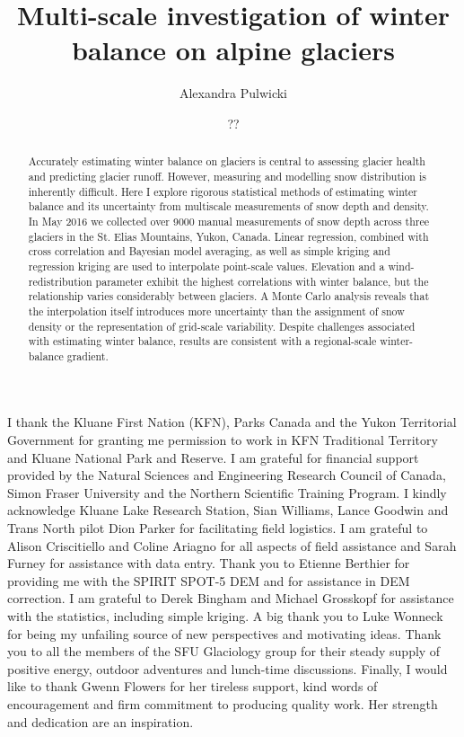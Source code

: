 \documentclass{sfuthesis}
\title{Multi-scale investigation of winter balance on alpine glaciers}
\author{Alexandra Pulwicki}
\date{??}
\begin{document}
\frontmatter
\maketitle{}
\makecommittee{}

\begin{abstract}
	Accurately estimating winter balance on glaciers is central to assessing glacier health and predicting glacier runoff. However, measuring and modelling snow distribution is inherently difficult. Here I explore rigorous statistical methods of estimating winter balance and its uncertainty from multiscale measurements of snow depth and density. In May 2016 we collected over 9000 manual measurements of snow depth across three glaciers in the St. Elias Mountains, Yukon, Canada. Linear regression, combined with cross correlation and Bayesian model averaging, as well as simple kriging and regression kriging are used to interpolate point-scale values. Elevation and a wind-redistribution parameter exhibit the highest correlations with winter balance, but the relationship varies considerably between glaciers. A Monte Carlo analysis reveals that the interpolation itself introduces more uncertainty than the assignment of snow density or the representation of grid-scale variability. Despite challenges associated with estimating winter balance, results are consistent with a regional-scale winter-balance gradient.
\end{abstract}




\begin{acknowledgements}
I thank the Kluane First Nation (KFN), Parks Canada and the Yukon Territorial Government for granting me permission to work in KFN Traditional Territory and Kluane National Park and Reserve. I am grateful for financial support provided by the Natural Sciences and Engineering Research Council of  Canada, Simon Fraser University and the Northern Scientific  Training Program. I kindly acknowledge Kluane Lake Research Station, Sian Williams, Lance Goodwin and Trans North pilot Dion Parker for facilitating field logistics. I am grateful to Alison Criscitiello and Coline Ariagno for all aspects of field assistance and Sarah Furney for assistance with data entry. Thank you to Etienne Berthier for providing me with the SPIRIT SPOT-5 DEM and for assistance in DEM correction. I am grateful to Derek Bingham and Michael Grosskopf for assistance with the statistics, including simple kriging. A big thank you to Luke Wonneck for being my unfailing source of new perspectives and motivating ideas. Thank you to all the members of the SFU Glaciology group for their steady supply of positive energy, outdoor adventures and lunch-time discussions. Finally, I would like to thank Gwenn Flowers for her tireless support, kind words of encouragement and firm commitment to producing quality work. Her strength and dedication are an inspiration. 
\end{acknowledgements}
\end{document}
